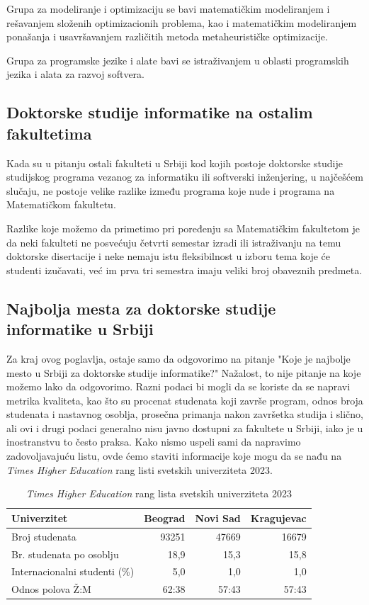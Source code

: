\documentclass[a4paper]{article}
\begin{document}
Grupa za modeliranje i optimizaciju se bavi matematičkim modeliranjem i rešavanjem složenih optimizacionih problema, kao i matematičkim modeliranjem ponašanja i usavršavanjem različitih metoda metaheurističke optimizacije.

Grupa za programske jezike i alate bavi se istraživanjem u oblasti programskih jezika i alata za razvoj softvera.

\subsection{Doktorske studije informatike na ostalim fakultetima}

Kada su u pitanju ostali fakulteti u Srbiji kod kojih postoje doktorske studije studijskog programa vezanog za informatiku ili softverski inženjering, u najčešćem slučaju, ne postoje velike razlike između programa koje nude i programa na Matematičkom fakultetu. 

Razlike koje možemo da primetimo pri poređenju sa Matematičkim fakultetom je da neki fakulteti ne posvećuju četvrti semestar izradi ili istraživanju na temu doktorske disertacije i neke nemaju istu fleksibilnost u izboru tema koje će studenti izučavati, već im prva tri semestra imaju veliki broj obaveznih predmeta.

\subsection{Najbolja mesta za doktorske studije informatike u Srbiji}

Za kraj ovog poglavlja, ostaje samo da odgovorimo na pitanje "Koje je najbolje mesto u Srbiji za doktorske studije informatike?" Nažalost, to nije pitanje na koje možemo lako da odgovorimo. Razni podaci bi mogli da se koriste da se napravi metrika kvaliteta, kao što su procenat studenata koji završe program, odnos broja studenata i nastavnog osoblja, prosečna primanja nakon završetka studija i slično, ali ovi i drugi podaci generalno nisu javno dostupni za fakultete u Srbiji, iako je u inostranstvu to često praksa. Kako nismo uspeli sami da napravimo zadovoljavajuću listu, ovde ćemo staviti informacije koje mogu da se nađu na \emph{Times Higher Education} rang listi svetskih univerziteta 2023\cite{worldUniRanking}.

\begin{table}[h!]
\begin{center}
\caption{\emph{Times Higher Education} rang lista svetskih univerziteta 2023}
\begin{tabular}{|l|r|r|r|} \hline
Univerzitet& Beograd& Novi Sad& Kragujevac\\ \hline
Broj studenata&93251&47669&16679\\ \hline
Br. studenata po osoblju & 18,9&15,3&15,8\\ \hline
Internacionalni studenti (\%) & 5,0&1,0&1,0\\ \hline
Odnos polova Ž:M& 62:38&57:43&57:43\\ \hline
\end{tabular}
\label{tab:tabela1}
\end{center}
\end{table}
\end{document}

